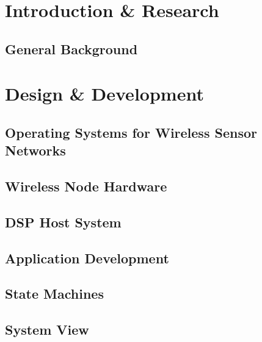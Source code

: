 \part{Introduction \& Research}
\chapter{General Background}





\part{Design \& Development} 
\chapter{Operating Systems for Wireless Sensor Networks}



\chapter{Wireless Node Hardware}



\chapter{DSP Host System}



\chapter{Application Development}



\chapter{State Machines}



\chapter{System View}









